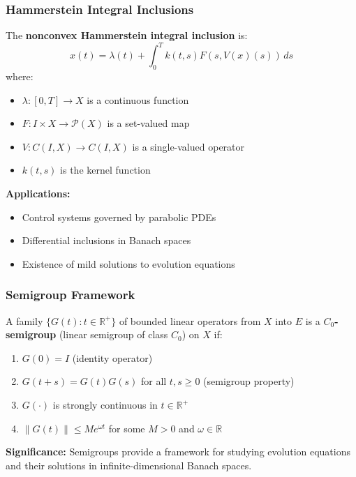 \documentclass[aspectratio=169,10pt]{beamer}
\begin{document}
\begin{frame}
\frametitle{Hammerstein Integral Inclusions}

\begin{definition}
The \textbf{nonconvex Hammerstein integral inclusion} is:
\[
x(t) = \lambda(t) + \int_0^T k(t,s) F(s, V(x)(s)) \, ds
\]
where:
\begin{itemize}
    \item $\lambda: [0,T] \to X$ is a continuous function
    \item $F: I \times X \to \mathcal{P}(X)$ is a set-valued map
    \item $V: C(I,X) \to C(I,X)$ is a single-valued operator
    \item $k(t,s)$ is the kernel function
\end{itemize}
\end{definition}

\vspace{0.5cm}

\textbf{Applications:}
\begin{itemize}
    \item Control systems governed by parabolic PDEs
    \item Differential inclusions in Banach spaces
    \item Existence of mild solutions to evolution equations
\end{itemize}

\end{frame}

\begin{frame}
\frametitle{Semigroup Framework}

\begin{definition}[C₀-Semigroup]
A family $\{G(t) : t \in \mathbb{R}^+\}$ of bounded linear operators from $X$ into $E$ is a \textbf{$C_0$-semigroup} (linear semigroup of class $C_0$) on $X$ if:
\begin{enumerate}
    \item $G(0) = I$ (identity operator)
    \item $G(t+s) = G(t)G(s)$ for all $t, s \geq 0$ (semigroup property)
    \item $G(\cdot)$ is strongly continuous in $t \in \mathbb{R}^+$
    \item $\|G(t)\| \leq M e^{\omega t}$ for some $M > 0$ and $\omega \in \mathbb{R}$
\end{enumerate}
\end{definition}

\vspace{0.5cm}

\textbf{Significance:} Semigroups provide a framework for studying evolution equations and their solutions in infinite-dimensional Banach spaces.

\end{frame}
\end{document}
